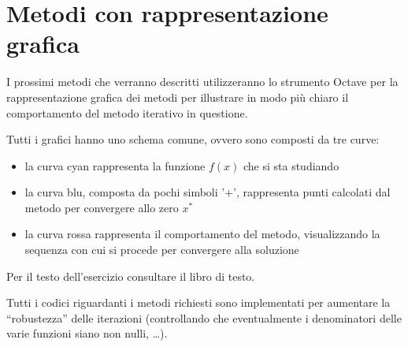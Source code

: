 \section*{Metodi con rappresentazione grafica}
I prossimi metodi che verranno descritti utilizzeranno lo strumento Octave
per la rappresentazione grafica dei metodi per illustrare in modo pi\`u chiaro
il comportamento del metodo iterativo in questione.

Tutti i grafici hanno uno schema comune, ovvero sono composti da tre curve:
\begin{itemize}
  \item la curva cyan rappresenta la funzione $f(x)$ che si sta studiando
  \item la curva blu, composta da pochi simboli '$+$', rappresenta punti
  calcolati dal metodo per convergere allo zero $x^{*}$
  \item la curva rossa rappresenta il comportamento del metodo, visualizzando
  la sequenza con cui si procede per convergere alla soluzione
\end{itemize}





\begin{exercise}[2.9]
Per il testo dell'esercizio consultare il libro di testo.
\end{exercise}
Tutti i codici riguardanti i metodi richiesti sono implementati per aumentare
la ``robustezza'' delle iterazioni (controllando che eventualmente i
denominatori delle varie funzioni siano non nulli, \ldots).



